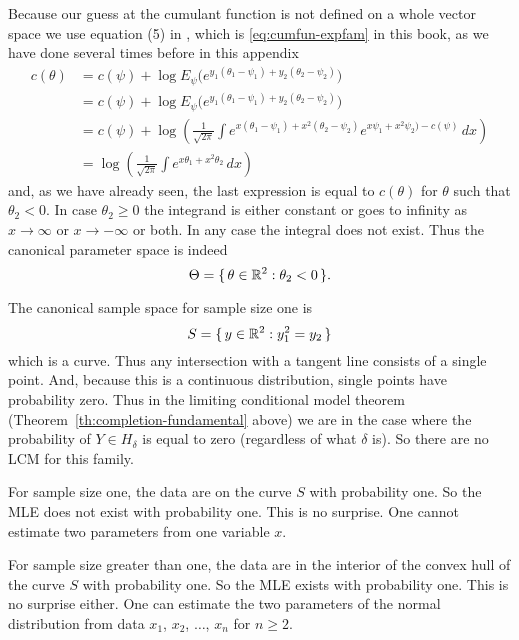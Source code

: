 Because our guess at the cumulant function is not defined on a whole vector
space we use equation (5) in \citet{geyer-gdor},
which is \eqref{eq:cumfun-expfam}
in this book, as we have done several times before in this appendix
\begin{align*}
   c(\theta)
   & =
   c(\psi) + \log E_\psi
   \bigl( e^{y_1 (\theta_1 - \psi_1) + y_2 (\theta_2 - \psi_2)} \bigr)
   \\
   & =
   c(\psi) + \log E_\psi
   \bigl( e^{y_1 (\theta_1 - \psi_1) + y_2 (\theta_2 - \psi_2)} \bigr)
   \\
   & =
   c(\psi)
   +
   \log \left( \frac{1}{\sqrt{2 \pi}} \int
   e^{x (\theta_1 - \psi_1) + x^2 (\theta_2 - \psi_2)}
   e^{x \psi_1 + x^2 \psi_2) - c(\psi)} \, d x \right)
   \\
   & =
   \log \left( \frac{1}{\sqrt{2 \pi}} \int
   e^{x \theta_1 + x^2 \theta_2} \, d x \right)
\end{align*}
and, as we have already seen, the last expression is equal to $c(\theta)$ for
$\theta$ such that $\theta_2 < 0$.
In case $\theta_2 \ge 0$ the integrand is either constant or goes to infinity
as $x \to \infty$ or $x \to - \infty$ or both.  In any case the integral
does not exist.  Thus the canonical parameter space is indeed
\begin{equation} \label{eq:canonical-parameter-space-normal-location-scale}
   \Theta = \{\,  \theta \in \mathbb{R}^2 : \theta_2 < 0  \,\}.
\end{equation}

The canonical sample space for sample size one is
$$
   S = \{\,  y \in \mathbb{R}^2 : y_1^2 = y_2  \,\}
$$
which is a curve.  Thus any intersection with a tangent line consists of
a single point.  And, because this is a continuous distribution, single points
have probability zero.  Thus in the limiting conditional model theorem
(Theorem~\ref{th:completion-fundamental} above) we are in the case where
the probability of $Y \in H_\delta$ is equal to zero
(regardless of what $\delta$ is).  So there are no LCM for this family.

For sample size one, the data are on the curve $S$ with probability one.
So the MLE does not exist with probability one.  This is no surprise.
One cannot estimate two parameters from one variable $x$.

For sample size greater than one, the data are in the interior of the convex
hull of the curve $S$ with probability one.
So the MLE exists with probability one.  This is no surprise either.
One can estimate the two parameters of the normal distribution from
data $x_1$, $x_2$, $\ldots$, $x_n$ for $n \ge 2$.

